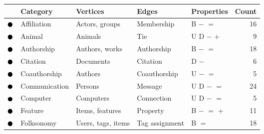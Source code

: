 \begin{tabular}{lllllr}
\toprule
& \textbf{Category} & \textbf{Vertices} & \textbf{Edges} & \textbf{Properties} & \textbf{Count} \\
\midrule
\textcolor{colorAffiliation}{$\newmoon$} &Affiliation & Actors, groups & Membership & \phantom{U} \phantom{D} B $-$ $=$ \phantom{$+$} \phantom{$\pm$} \phantom{$\stackrel{+}{=}$} \phantom{$*$} \phantom{$_*{}^*$} \phantom{$\rightleftarrows$} \phantom{$++$}  &  16\\
\textcolor{colorAnimal}{$\newmoon$} &Animal & Animals & Tie & U D \phantom{B} $-$ \phantom{$=$} $+$ \phantom{$\pm$} \phantom{$\stackrel{+}{=}$} \phantom{$*$} \phantom{$_*{}^*$} \phantom{$\rightleftarrows$} \phantom{$++$}  &  9\\
\textcolor{colorAuthorship}{$\newmoon$} &Authorship & Authors, works & Authorship & \phantom{U} \phantom{D} B $-$ $=$ \phantom{$+$} \phantom{$\pm$} \phantom{$\stackrel{+}{=}$} \phantom{$*$} \phantom{$_*{}^*$} \phantom{$\rightleftarrows$} \phantom{$++$}  &  18\\
\textcolor{colorCitation}{$\newmoon$} &Citation & Documents & Citation & \phantom{U} D \phantom{B} $-$ \phantom{$=$} \phantom{$+$} \phantom{$\pm$} \phantom{$\stackrel{+}{=}$} \phantom{$*$} \phantom{$_*{}^*$} \phantom{$\rightleftarrows$} \phantom{$++$}  &  6\\
\textcolor{colorCoauthorship}{$\newmoon$} &Coauthorship & Authors & Coauthorship & U \phantom{D} \phantom{B} $-$ $=$ \phantom{$+$} \phantom{$\pm$} \phantom{$\stackrel{+}{=}$} \phantom{$*$} \phantom{$_*{}^*$} \phantom{$\rightleftarrows$} \phantom{$++$}  &  5\\
\textcolor{colorCommunication}{$\newmoon$} &Communication & Persons & Message & U D \phantom{B} $-$ $=$ \phantom{$+$} \phantom{$\pm$} \phantom{$\stackrel{+}{=}$} \phantom{$*$} \phantom{$_*{}^*$} \phantom{$\rightleftarrows$} \phantom{$++$}  &  24\\
\textcolor{colorComputer}{$\newmoon$} &Computer & Computers & Connection & U D \phantom{B} $-$ $=$ \phantom{$+$} \phantom{$\pm$} \phantom{$\stackrel{+}{=}$} \phantom{$*$} \phantom{$_*{}^*$} \phantom{$\rightleftarrows$} \phantom{$++$}  &  5\\
\textcolor{colorFeature}{$\newmoon$} &Feature & Items, features & Property & \phantom{U} \phantom{D} B $-$ $=$ $+$ \phantom{$\pm$} \phantom{$\stackrel{+}{=}$} \phantom{$*$} \phantom{$_*{}^*$} \phantom{$\rightleftarrows$} \phantom{$++$}  &  11\\
\textcolor{colorFolksonomy}{$\newmoon$} &Folksonomy & Users, tags, items & Tag assignment & \phantom{U} \phantom{D} B \phantom{$-$} $=$ \phantom{$+$} \phantom{$\pm$} \phantom{$\stackrel{+}{=}$} \phantom{$*$} \phantom{$_*{}^*$} \phantom{$\rightleftarrows$} \phantom{$++$}  &  18\\

\end{tabular}
